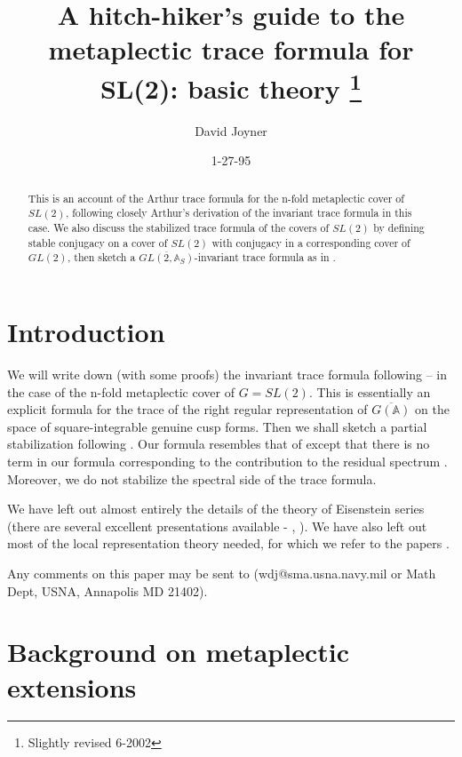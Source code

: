 \documentclass[12pt]{article}
\numberwithin{equation}{section}
\def\aaa{\mathbb{A}}
\begin{document}
\author{David Joyner}
\title{A hitch-hiker's guide to the
metaplectic trace formula for SL(2): basic theory
\thanks{Slightly revised 6-2002}}
\date{1-27-95}
\maketitle

\begin{abstract}
This is an account of the Arthur trace formula for the
n-fold metaplectic cover of $SL(2)$, following closely
Arthur's derivation of the invariant trace formula in this case.
We also discuss the stabilized trace formula of
the covers of $SL(2)$ by defining
stable conjugacy on a cover of $SL(2)$ with conjugacy
in a corresponding cover of $GL(2)$,
then sketch a $\overline{GL(2,\aaa _S)}$-invariant
trace formula as in \cite{LL}.
\end{abstract}

\tableofcontents

\section{Introduction}\label{sec:intro}

We will write down (with some proofs) the invariant trace
formula following \cite{A2}--\cite{A15} in the case of the
n-fold metaplectic cover of $G=SL(2)$.
This is essentially an explicit formula for the trace of
the right regular representation of
$\overline{G(\aaa )}$ on the space of square-integrable
genuine cusp forms.
Then we shall sketch a partial stabilization following \cite{LL}.
Our formula resembles that of \cite{LL} except that there
is no term in our formula corresponding to the
contribution to the residual spectrum
\cite[(5.5), p. 754]{LL}. Moreover, we do not stabilize the spectral
side of the trace formula.

We have left out almost entirely the details of the theory of
Eisenstein
series (there are several excellent presentations available -
\cite{L1,L2}, \cite{K2}). We have also left out most of the
local representation theory needed, for which we refer to the
papers \cite{J1,J3}.

Any comments on this paper may be sent to
(wdj@sma.usna.navy.mil or Math Dept, USNA, Annapolis MD 21402).

\section{Background on metaplectic extensions}\label{sec:background}
\end{document}
